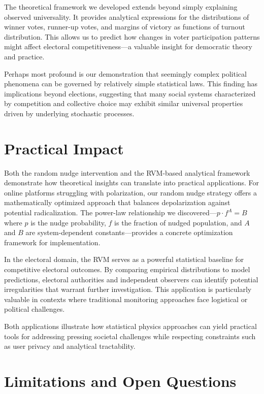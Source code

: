 The theoretical framework we developed extends beyond simply explaining observed universality. It provides analytical expressions for the distributions of winner votes, runner-up votes, and margins of victory as functions of turnout distribution. This allows us to predict how changes in voter participation patterns might affect electoral competitiveness—a valuable insight for democratic theory and practice.

Perhaps most profound is our demonstration that seemingly complex political phenomena can be governed by relatively simple statistical laws. This finding has implications beyond elections, suggesting that many social systems characterized by competition and collective choice may exhibit similar universal properties driven by underlying stochastic processes.

\section{Practical Impact}

Both the random nudge intervention and the RVM-based analytical framework demonstrate how theoretical insights can translate into practical applications. For online platforms struggling with polarization, our random nudge strategy offers a mathematically optimized approach that balances depolarization against potential radicalization. The power-law relationship we discovered—$p \cdot f^A = B$ where $p$ is the nudge probability, $f$ is the fraction of nudged population, and $A$ and $B$ are system-dependent constants—provides a concrete optimization framework for implementation.

In the electoral domain, the RVM serves as a powerful statistical baseline for competitive electoral outcomes. By comparing empirical distributions to model predictions, electoral authorities and independent observers can identify potential irregularities that warrant further investigation. This application is particularly valuable in contexts where traditional monitoring approaches face logistical or political challenges.

Both applications illustrate how statistical physics approaches can yield practical tools for addressing pressing societal challenges while respecting constraints such as user privacy and analytical tractability.

\section{Limitations and Open Questions}

